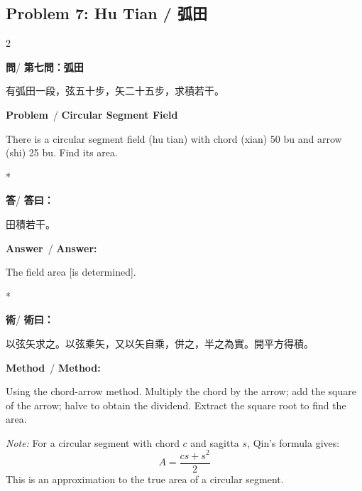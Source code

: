 \documentclass[11pt,a4paper]{article}
\newcommand{\wen}{\textbf{\color{sectioncolor}問}}
\newcommand{\da}{\textbf{\color{answercolor}答}}
\newcommand{\shu}{\textbf{\color{methodcolor}術}}
\newcommand{\prb}{\textbf{\color{sectioncolor}Problem}}
\newcommand{\ans}{\textbf{\color{answercolor}Answer}}
\newcommand{\meth}{\textbf{\color{methodcolor}Method}}
\begin{document}
\vspace{1em}

\subsection*{Problem 7: Hu Tian / 弧田}

\begin{paracol}{2}

\begin{leftcolumn*}
\wen / \textbf{第七問：弧田}

有弧田一段，弦五十步，矢二十五步，求積若干。
\end{leftcolumn*}

\begin{rightcolumn}
\prb\ / \textbf{Circular Segment Field}

There is a circular segment field (hu tian) with chord 
(xian) 50 bu and arrow (shi) 25 bu. Find its area.
\end{rightcolumn}

\switchcolumn[0]*

\begin{leftcolumn*}
\da / \textbf{答曰：}

田積若干。
\end{leftcolumn*}

\begin{rightcolumn}
\ans\ / \textbf{Answer:}

The field area [is determined].
\end{rightcolumn}

\switchcolumn[0]*

\begin{leftcolumn*}
\shu / \textbf{術曰：}

以弦矢求之。以弦乘矢，又以矢自乘，併之，半之為實。開平方得積。
\end{leftcolumn*}

\begin{rightcolumn}
\meth\ / \textbf{Method:}

Using the chord-arrow method. Multiply the chord by the 
arrow; add the square of the arrow; halve to obtain the dividend. Extract 
the square root to find the area.

\medskip
\textit{Note:} For a circular segment with chord $c$ and sagitta $s$, 
Qin's formula gives:
\[
A = \frac{cs + s^2}{2}
\]
This is an approximation to the true area of a circular segment.
\end{rightcolumn}

\end{paracol}
\end{document}
